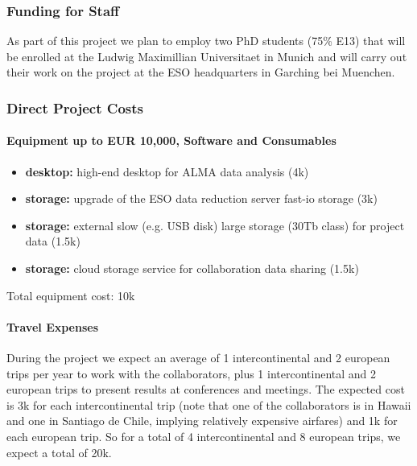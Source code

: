\documentclass[10pt,fleqn,twoside]{article}
\begin{document}
\subsubsection{Funding for Staff}

As part of this project we plan to employ two PhD students (75\% E13) that will be enrolled at the Ludwig Maximillian Universitaet in Munich and will carry out their work on the project at the ESO headquarters in Garching bei Muenchen.

\subsubsection{Direct Project Costs}


\paragraph{Equipment up to EUR 10,000, Software and Consumables}

\begin{itemize}
\item {\bf desktop:} high-end desktop for ALMA data analysis (4k\EUR{}) 
\item {\bf storage:} upgrade of the ESO data reduction server fast-io storage (3k\EUR{})
\item {\bf storage:} external slow (e.g. USB disk) large storage (30Tb class) for project data (1.5k\EUR{})
\item {\bf storage:} cloud storage service for collaboration data sharing (1.5k\EUR{})
\end{itemize}

Total equipment cost: 10k\EUR{}  

\paragraph{Travel Expenses}

During the project we expect an average of 1 intercontinental and 2 european
trips per year to work with the collaborators, plus 1 intercontinental and 2
european trips to present results at conferences and meetings. The expected
cost is 3k\EUR{} for each intercontinental trip (note that one of the
collaborators is in Hawaii and one in Santiago de Chile, implying relatively
expensive airfares) and 1k\EUR{} for each european trip. So for a total of
4 intercontinental and 8 european trips, we expect a total of 20k\EUR{}.  \smallskip
\end{document}
